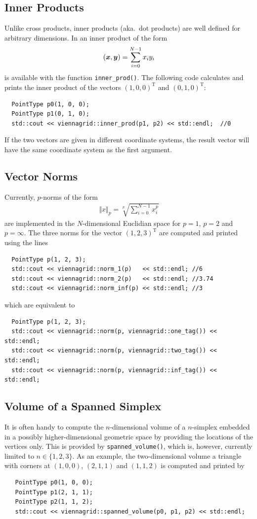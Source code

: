   \subsection{Inner Products}
 Unlike cross products, inner products (aka.~dot products) are well defined for arbitrary dimensions. In {\ViennaGridversion} an inner product of the form
\begin{align}
 (\boldsymbol{x}, \boldsymbol{y}) = \sum_{i=0}^{N-1} x_i y_i
\end{align}
is available with the function \lstinline|inner_prod()|. The following code calculates and prints the inner product of the vectors $(1,0,0)^\mathrm{T}$ and $(0,1,0)^\mathrm{T}$:
 \begin{lstlisting}
  PointType p0(1, 0, 0);
  PointType p1(0, 1, 0);
  std::cout << viennagrid::inner_prod(p1, p2) << std::endl;  //0
 \end{lstlisting}
 If the two vectors are given in different coordinate systems, the result vector will have the same coordinate system as the first argument.

  \subsection{Vector Norms}
 Currently, $p$-norms of the form
  \begin{align}
   \Vert x \Vert_p = \sqrt[p]{\sum_{i=0}^{N-1} x_i^p}
  \end{align}
 are implemented in the $N$-dimensional Euclidian space for $p=1$, $p=2$ and $p=\infty$. The three norms for the vector $(1,2,3)^\mathrm{T}$ are computed and printed using the lines
 \begin{lstlisting}
  PointType p(1, 2, 3);
  std::cout << viennagrid::norm_1(p)   << std::endl; //6
  std::cout << viennagrid::norm_2(p)   << std::endl; //3.74
  std::cout << viennagrid::norm_inf(p) << std::endl; //3
 \end{lstlisting}
which are equivalent to
 \begin{lstlisting}
  PointType p(1, 2, 3);
  std::cout << viennagrid::norm(p, viennagrid::one_tag()) << std::endl;
  std::cout << viennagrid::norm(p, viennagrid::two_tag()) << std::endl;
  std::cout << viennagrid::norm(p, viennagrid::inf_tag()) << std::endl;
 \end{lstlisting}


  \subsection{Volume of a Spanned Simplex}
  It is often handy to compute the $n$-dimensional volume of a $n$-simplex embedded in a possibly higher-dimensional geometric space by providing the locations of the vertices only.
  This is provided by \lstinline|spanned_volume()|, which is, however, currently limited to $n \in \{1, 2, 3\}$.
  As an example, the two-dimensional volume a triangle with corners at $(1, 0, 0)$, $(2, 1, 1)$ and $(1, 1, 2)$ is computed and printed by
  \begin{lstlisting}
   PointType p0(1, 0, 0);
   PointType p1(2, 1, 1);
   PointType p2(1, 1, 2);
   std::cout << viennagrid::spanned_volume(p0, p1, p2) << std::endl;
  \end{lstlisting}



